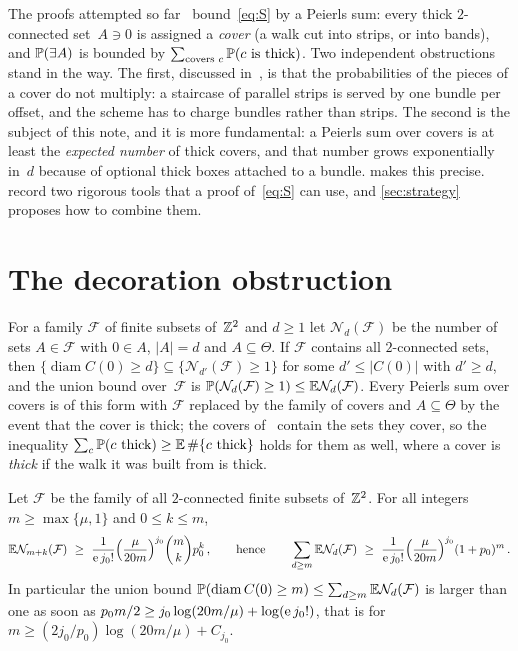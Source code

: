 \documentclass[11pt,letterpaper]{article}
\DeclareMathOperator{\diam}{diam}
\begin{document}
The proofs attempted so far~\cite{SC26,PS26} bound~\eqref{eq:S} by a Peierls sum: every thick $2$-connected set~$A\ni0$ is assigned a \emph{cover} (a walk cut into strips, or into bands), and $\P(\exists A)$ is bounded by $\sum_{\text{covers }c}\P(c\text{ is thick})$. Two independent obstructions stand in the way. The first, discussed in~\cite{PS26}, is that the probabilities of the pieces of a cover do not multiply: a staircase of parallel strips is served by one bundle per offset, and the scheme has to charge bundles rather than strips. The second is the subject of this note, and it is more fundamental: a Peierls sum over covers is at least the \emph{expected number} of thick covers, and that number grows exponentially in~$d$ because of optional thick boxes attached to a bundle.  makes this precise.  record two rigorous tools that a proof of~\eqref{eq:S} can use, and \cref{sec:strategy} proposes how to combine them.

\section{The decoration obstruction}
\label{sec:decorations}

For a family $\mathcal F$ of finite subsets of~$\Z^2$ and $d\ge1$ let $\mathcal N_d(\mathcal F)$ be the number of sets $A\in\mathcal F$ with $0\in A$, $\lvert A\rvert=d$ and $A\subseteq\Theta$. If $\mathcal F$ contains all $2$-connected sets, then $\{\diam C(0)\ge d\}\subseteq\{\mathcal N_{d'}(\mathcal F)\ge1\}$ for some $d'\le\lvert C(0)\rvert$ with $d'\ge d$, and the union bound over~$\mathcal F$ is $\P(\mathcal N_{d}(\mathcal F)\ge1)\le\E\mathcal N_d(\mathcal F)$. Every Peierls sum over covers is of this form with $\mathcal F$ replaced by the family of covers and $A\subseteq\Theta$ by the event that the cover is thick; the covers of~\cite{SC26} contain the sets they cover, so the inequality $\sum_c\P(c\text{ thick})\ge\E\,\#\{c\text{ thick}\}$ holds for them as well, where a cover is \emph{thick} if the walk it was built from is thick.

\begin{proposition}[Decorations]
\label{prop:decorations}
Let $\mathcal F$ be the family of all $2$-connected finite subsets of~$\Z^2$. For all integers $m\ge\max\{\mu,1\}$ and $0\le k\le m$,
\begin{equation}
\label{eq:decorations}
  \E\mathcal N_{m+k}(\mathcal F)\ \ge\ \frac{1}{\e\,j_0!}\Bigl(\frac{\mu}{20m}\Bigr)^{j_0}\binom mkp_0^k\,,
  \qquad\text{hence}\qquad
  \sum_{d\ge m}\E\mathcal N_d(\mathcal F)\ \ge\ \frac{1}{\e\,j_0!}\Bigl(\frac{\mu}{20m}\Bigr)^{j_0}(1+p_0)^{m}\,.
\end{equation}
In particular the union bound $\P(\diam C(0)\ge m)\le\sum_{d\ge m}\E\mathcal N_{d}(\mathcal F)$ is larger than one as soon as $p_0m/2\ge j_0\log(20m/\mu)+\log(\e\,j_0!)$, that is for $m\ge(2j_0/p_0)\log(20m/\mu)+C_{j_0}$.
\end{proposition}
\end{document}

